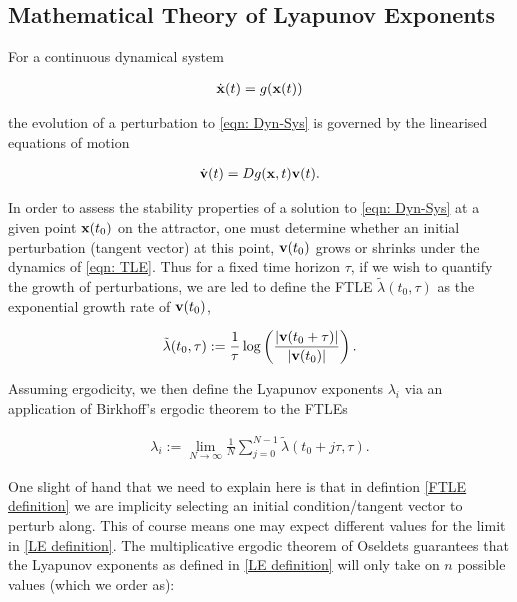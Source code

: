 \subsection{Mathematical Theory of Lyapunov Exponents} \label{subsection: LE Basics}

For a continuous dynamical system

\begin{align}
\dot{\vb{x}}(t) = g(\vb{x}(t)) \label{eqn: Dyn-Sys}
\end{align}

the evolution of a perturbation to \ref{eqn: Dyn-Sys} is governed by the linearised equations of motion

\begin{align}
\dot{\vb{v}}(t) = Dg(\vb{x}, t)\vb{v}(t) \label{eqn: TLE}.
\end{align}

In order to assess the stability properties of a solution to \ref{eqn: Dyn-Sys} at a given point $\vb{x}(t_0)$ on the attractor, one must determine whether an initial perturbation (tangent vector) at this point, $\vb{v}(t_0)$ grows or shrinks under the dynamics of \ref{eqn: TLE}. Thus for a fixed time horizon $\tau$, if we wish to quantify the growth of perturbations, we are led to define the FTLE $\tilde{\lambda}(t_0, \tau)$ as the exponential growth rate of $\vb{v}(t_0)$,

\begin{align}
\tilde{\lambda}(t_0, \tau) := \frac{1}{\tau} \log \left( {\frac{|\vb{v}(t_0 + \tau)|}{|\vb{v}(t_0)|}} \right). \label{FTLE definition}
\end{align}

Assuming ergodicity, we then define the Lyapunov exponents $\lambda_i$ via an application of Birkhoff's ergodic theorem \cite{Petersen1989} to the FTLEs

\begin{align}
    \lambda_i := \lim_{N \to \infty} \frac{1}{N} \sum_{j = 0} ^ {N-1} \tilde{\lambda}(t_0 + j \tau, \tau). \label{LE definition}
\end{align}

One slight of hand that we need to explain here is that in defintion \ref{FTLE definition} we are implicity selecting an initial condition/tangent vector to perturb along. This of course means one may expect different values for the limit in \ref{LE definition}. The multiplicative ergodic theorem of Oseldets \cite{Oseledets1968} guarantees that the Lyapunov exponents as defined in \ref{LE definition} will only take on $n$ possible values (which we order as):

